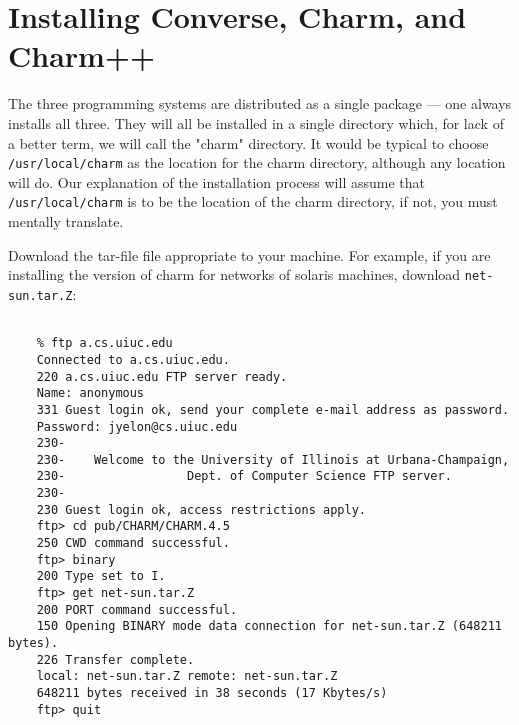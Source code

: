 %
%
%
%
%
%

\section{Installing Converse, Charm, and Charm++}

The three programming systems are distributed as a single package ---
one always installs all three.  They will all be installed in a single
directory which, for lack of a better term, we will call the "charm"
directory.  It would be typical to choose {\tt /usr/local/charm} as
the location for the charm directory, although any location will do.
Our explanation of the installation process will assume that {\tt
/usr/local/charm} is to be the location of the charm directory,
if not, you must mentally translate.

Download the tar-file file appropriate to your machine.  For example,
if you are installing the version of charm for networks of solaris
machines, download {\tt net-sun.tar.Z}:

\begin{verbatim}

    % ftp a.cs.uiuc.edu
    Connected to a.cs.uiuc.edu.
    220 a.cs.uiuc.edu FTP server ready.
    Name: anonymous
    331 Guest login ok, send your complete e-mail address as password.
    Password: jyelon@cs.uiuc.edu
    230-
    230-    Welcome to the University of Illinois at Urbana-Champaign,
    230-                 Dept. of Computer Science FTP server.
    230-
    230 Guest login ok, access restrictions apply.
    ftp> cd pub/CHARM/CHARM.4.5
    250 CWD command successful.
    ftp> binary
    200 Type set to I.
    ftp> get net-sun.tar.Z
    200 PORT command successful.
    150 Opening BINARY mode data connection for net-sun.tar.Z (648211 bytes).
    226 Transfer complete.
    local: net-sun.tar.Z remote: net-sun.tar.Z
    648211 bytes received in 38 seconds (17 Kbytes/s)
    ftp> quit

\end{verbatim}

